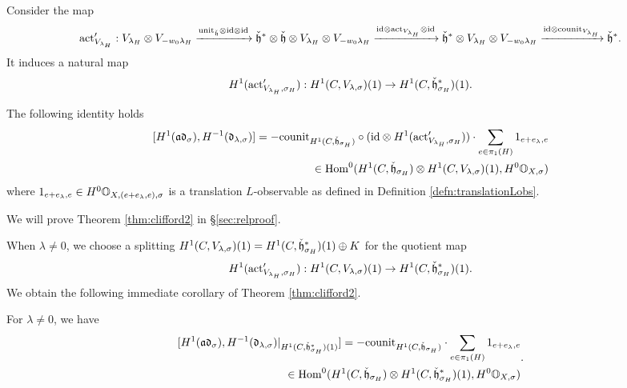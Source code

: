 \documentclass[reqno]{amsart}
\numberwithin{equation}{section}
\numberwithin{equation}{section}
\begin{document}
Consider the map \begin{equation}\label{eq:act*}
    \mathrm{act}_{V_{\lambda_H}}':V_{\lambda_H}\otimes V_{-w_0\lambda_H}\xrightarrow{\mathrm{unit}_{\check{\mathfrak{h}}}\otimes\mathrm{id}\otimes\mathrm{id}} \check{\mathfrak{h}}^*\otimes \check{\mathfrak{h}}\otimes V_{\lambda_H}\otimes V_{-w_0\lambda_H}\xrightarrow{\mathrm{id}\otimes\mathrm{act}_{V_{\lambda_H}} \otimes \mathrm{id}} \check{\mathfrak{h}}^*\otimes V_{\lambda_H}\otimes V_{-w_0\lambda_H}\xrightarrow{\mathrm{id}\otimes\mathrm{counit}_{V_{\lambda_H}}} \check{\mathfrak{h}}^* 
.\end{equation} It induces a natural map \begin{equation}\label{eq:act*s} H^1(\mathrm{act}_{V_{\lambda_H},\sigma_H}'):H^{1}(C, V_{\lambda,\sigma})(1)\to H^1(C,\check{\mathfrak{h}}_{\sigma_H}^*)(1).\end{equation}

\begin{thm}\label{thm:clifford2}
    The following identity holds \[\begin{split}[H^1(\mathfrak{a}\mathfrak{d}_{\sigma}), H^{-1}(\mathfrak{d}_{\lambda,\sigma})]=-\mathrm{counit}_{H^1(C,\check{\mathfrak{h}}_{\sigma_H})}\circ (\mathrm{id}\otimes H^1(\mathrm{act}_{V_{\lambda_H},\sigma_H}'))\cdot \sum_{e\in \pi_1(H)}1_{e+e_{\lambda},e} \\ \in \operatorname{Hom}^0(H^1(C,\check{\mathfrak{h}}_{\sigma_H})\otimes H^1(C,V_{\lambda,\sigma})(1), H^0\mathbb{O}_{X,\sigma})\end{split}\] where $1_{e+e_{\lambda},e}\in H^0\mathbb{O}_{X,(e+e_{\lambda},e),\sigma}$ is a translation $L$-observable as defined in Definition \ref{defn:translationLobs}. 
\end{thm}

We will prove Theorem \ref{thm:clifford2} in \S\ref{sec:relproof}.

When $\lambda\neq 0$, we choose a splitting $H^1(C,V_{\lambda,\sigma})(1)=H^1(C,\check{\mathfrak{h}}_{\sigma_H}^*)(1)\oplus K$ for the quotient map \[H^1(\mathrm{act}_{V_{\lambda_H},\sigma_H}'):H^1(C,V_{\lambda,\sigma})(1)\to H^1(C,\check{\mathfrak{h}}_{\sigma_H}^*)(1).\] We obtain the following immediate corollary of Theorem \ref{thm:clifford2}.

\begin{cor}\label{cor:clifford2split}
For $\lambda\neq 0$, we have \[\begin{split}[H^1(\mathfrak{a}\mathfrak{d}_{\sigma}), H^{-1}(\mathfrak{d}_{\lambda,\sigma})|_{H^1(C,\check{\mathfrak{h}}_{\sigma_H}^*)(1)}]=-\mathrm{counit}_{H^1(C,\check{\mathfrak{h}}_{\sigma_H})}\cdot \sum_{e\in \pi_1(H)}1_{e+e_{\lambda},e} \\ \in \operatorname{Hom}^0( H^1(C,\check{\mathfrak{h}}_{\sigma_H})\otimes H^1(C,\check{\mathfrak{h}}_{\sigma_H}^*)(1), H^0\mathbb{O}_{X,\sigma})\end{split}.\] 
\end{cor}
\end{document}

